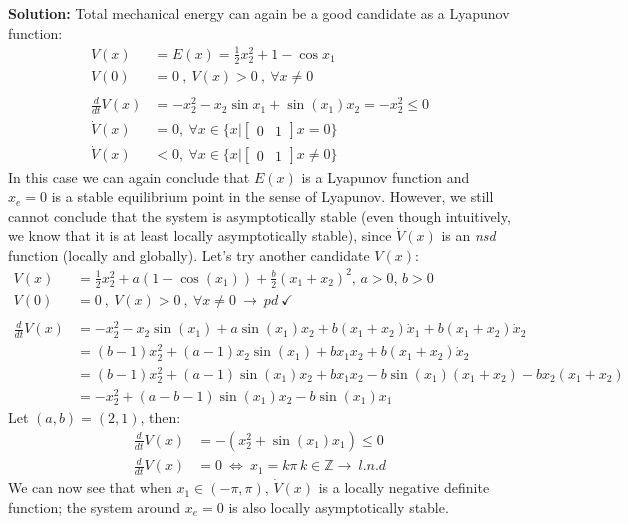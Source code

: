 \documentclass[twoside, 11pt]{article}
\begin{document}
\textbf{Solution:} Total mechanical energy can again be a good candidate as
a Lyapunov function:
%
\begin{align*}
V(x) &= E(x) = \frac{1}{2} x_2^2 + 1 - \cos{x_1}  \\ 
V(0) &= 0 \ , \ V(x) > 0 \ , \ \forall x \neq 0
\\
\\
\frac{d}{dt} V(x) &= - x_2^2 - x_2 \sin x_1 + \sin(x_1) x_2 = - x_2^2 \leq 0
\\
\dot{V}(x) &= 0 ,\ \forall x \in \lbrace x | \begin{bmatrix}0 & 1\end{bmatrix} x = 0 \rbrace
\\
\dot{V}(x) &< 0 ,\ \forall x \in \lbrace x | \begin{bmatrix}0 & 1\end{bmatrix} x \neq 0 \rbrace
\end{align*}
%
In this case we can again conclude that $E(x)$ is a Lyapunov function and $x_e = 0$
is a stable equilibrium point in the sense of Lyapunov. However, we still cannot 
conclude that the system is asymptotically stable (even though intuitively, we know that it is 
at least locally asymptotically stable), since $\dot{V}(x)$ is an \textit{nsd} function 
(locally and globally). Let's try another candidate $V(x)$:
%
\begin{align*}
V(x) &= \frac{1}{2} x_2^2 + a ( 1 - \cos(x_1) ) + \frac{b}{2} ( x_1 + x_2 )^2  ,
\, a > 0 , \,  b > 0
\\ 
V(0) &= 0 \ , \ V(x) > 0 \ , \ \forall x \neq 0 \ \rightarrow \ pd \ \checkmark
\\
\\
\frac{d}{dt} V(x) &= - x_2^2 - x_2 \sin(x_1) + a \sin(x_1) x_2 + b ( x_1 + x_2 ) \dot{x}_1 
+ b ( x_1 + x_2 ) \dot{x}_2
\\
&= (b - 1) x_2^2 + (a - 1) x_2 \sin(x_1) + b x_1 x_2 
+ b ( x_1 + x_2 ) \dot{x}_2
\\
&= (b - 1) x_2^2 + (a - 1) \sin(x_1) x_2 + b x_1 x_2 
- b \sin(x_1) ( x_1 + x_2 ) 
- b x_2 ( x_1 + x_2 ) 
\\
&= - x_2^2 + (a - b - 1) \sin(x_1) x_2 - b \sin(x_1) x_1 
\end{align*}
%
Let $(a,b) = (2,1)$, then:
\begin{align*}
\frac{d}{dt} V(x) &= - \left( x_2^2  + \sin(x_1) x_1 \right) \leq 0
\\
\frac{d}{dt} V(x) &= 0 \ \iff \ x_1 = k \pi \, k \in \mathbb{Z} \rightarrow \ l.n.d 
\end{align*}
%
We can now see that when $x_1 \in (-\pi , \pi)$, $\dot{V}(x)$ is a locally negative 
definite function; the system around $x_e = 0$ is also locally asymptotically stable. 
\end{document}
